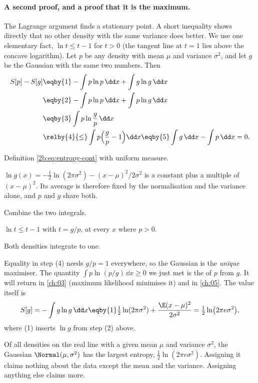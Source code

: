 \paragraph{A second proof, and a proof that it is the maximum.} The Lagrange argument finds a stationary point. A short inequality shows directly that no other density with the same variance does better. We use one elementary fact, $\ln t\le t-1$ for $t>0$ (the tangent line at $t=1$ lies above the concave logarithm). Let $p$ be any density with mean $\mu$ and variance $\sigma^2$, and let $g$ be the Gaussian with the same two numbers. Then
\begin{align}
  S[p]-S[g]
  &\eqby{1} -\int p\ln p\,\dd x+\int g\ln g\,\dd x \nonumber\\
  &\eqby{2} -\int p\ln p\,\dd x+\int p\ln g\,\dd x \nonumber\\
  &\eqby{3} \int p\ln\frac{g}{p}\,\dd x \nonumber\\
  &\relby{4}{\le} \int p\Bigl(\frac gp-1\Bigr)\dd x \eqby{5} \int g\,\dd x-\int p\,\dd x = 0 .
  \label{2b:eq:gibbs}
\end{align}
\begin{explain}
  \item Definition \eqref{2b:eq:entropy-cont} with uniform measure.
  \item $\ln g(x)=-\frac12\ln(2\pi\sigma^2)-(x-\mu)^2/2\sigma^2$ is a constant plus a multiple of $(x-\mu)^2$. Its average is therefore fixed by the normalisation and the variance alone, and $p$ and $g$ share both.
  \item Combine the two integrals.
  \item $\ln t\le t-1$ with $t=g/p$, at every $x$ where $p>0$.
  \item Both densities integrate to one.
\end{explain}
Equality in step (4) needs $g/p=1$ everywhere, so the Gaussian is the \emph{unique} maximiser. The quantity $\int p\ln(p/g)\,\dd x\ge0$ we just met is the  of $p$ from $g$. It will return in \cref{ch:03} (maximum likelihood minimises it) and in \cref{ch:05}. The value itself is
\[
  S[g]=-\int g\ln g\,\dd x\eqby{1}\tfrac12\ln(2\pi\sigma^2)+\frac{\E(x-\mu)^2}{2\sigma^2}=\tfrac12\ln\bigl(2\pi e\sigma^2\bigr),
\]
where (1) inserts $\ln g$ from step (2) above.

\begin{keyidea}
Of all densities on the real line with a given mean $\mu$ and variance $\sigma^2$, the Gaussian $\Normal(\mu,\sigma^2)$ has the largest entropy, $\tfrac12\ln(2\pi e\sigma^2)$. Assigning it claims nothing about the data except the mean and the variance. Assigning anything else claims more.
\end{keyidea}

